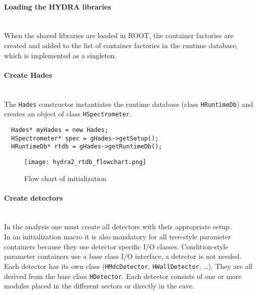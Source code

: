 \paragraph{Loading the HYDRA libraries} ~\\
When the shared libraries are loaded in ROOT, the container factories are created and added to the list of container 
factories in the runtime database, which is implemented as a singleton.

\paragraph{Create Hades} ~\\
The \verb+Hades+ constructor instantiates the runtime database (class \verb+HRuntimeDb+) and creates an object 
of class \verb+HSpectrometer+.\\
\begin{lstlisting}
  Hades* myHades = new Hades;
  HSpectrometer* spec = gHades->getSetup();
  HRuntimeDb* rtdb = gHades->getRuntimeDb();
\end{lstlisting}

\begin{figure}[\htb]
  \centering
  \texttt{[image: hydra2\_rtdb\_flowchart.png]}
  \caption[Flow chart of initialization]{Flow chart of initialization} \label{fig:rtdbFlowChart}
\end{figure}

\paragraph{Create detectors} ~\\
In the analysis one must create all detectors with their appropriate setup.\\
In an initialization macro it is also mandatory for all tree-style parameter containers because they use detector 
specific I/O classes. Condition-style parameter containers use a base class I/O interface, a detector is not needed.\\

Each detector has its own class (\verb+HMdcDetector+, \verb+HWallDetector+, \ldots). They are all derived from the base 
class \verb+HDetector+. Each detector consists of one or more modules placed in the different sectors or directly in the cave.\\

